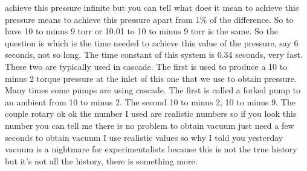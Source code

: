 achieve this pressure infinite but you can tell what does it mean to achieve this pressure means to achieve this pressure apart from 1\% of the difference. So to have 10 to minus 9 torr or 10.01 to 10 to minus 9 torr is the same. So the question is which is the time needed to achieve this value of the pressure, say 6 seconds, not so long. The time constant of this system is 0.34 seconds, very fast. These two are typically used in cascade. The first is used to produce a 10 to minus 2 torque pressure at the inlet of this one that we use to obtain pressure. Many times some pumps are using cascade. The first is called a forked pump to an ambient from 10 to minus 2. The second 10 to minus 2, 10 to minus 9. The couple rotary ok ok the number I used are realistic numbers so if you look this number you can tell me there is no problem to obtain vacuum just need a few seconds to obtain vacuum I use realistic values so why I told you yesterday vacuum is a nightmare for experimentalists because this is not the true history but it's not all the history, there is something more.

